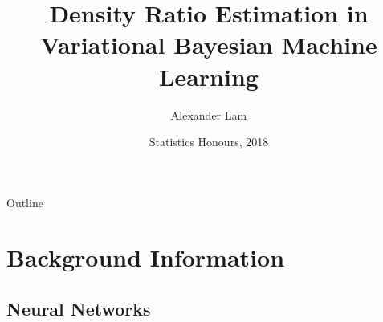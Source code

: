 \documentclass[handout]{beamer}
\title{Density Ratio Estimation in Variational Bayesian Machine Learning}
\author{Alexander Lam}
\institute[UNSW] %
{
  Supervised by Prof. Scott Sisson and Doctor Edwin Bonilla
  }
\date{Statistics Honours, 2018}
\begin{document}
\begin{frame}
  \titlepage
\end{frame}

\begin{frame}{Outline}
  \tableofcontents
\end{frame}

\section{Background Information}

\subsection{Neural Networks}
\end{document}
